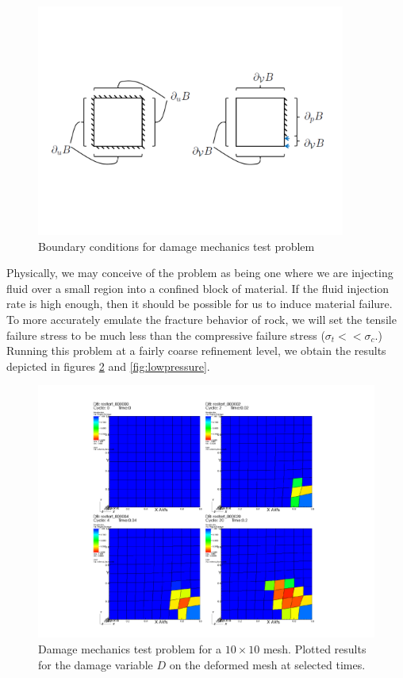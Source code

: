 \documentclass[11pt]{article} %
\begin{document}
\begin{figure} [!ht]
	\centering
	\includegraphics[width = 4.0in,trim=30 160 40 150,clip=true]{cracktest.pdf}
	\caption{Boundary conditions for damage mechanics test problem}
	\label{fig:cracktestbcs}
\end{figure}

Physically, we may conceive of the problem as being one where we are injecting fluid over a small region into a confined block of material. If the fluid injection rate is high enough, then it should be possible for us to induce material failure. To more accurately emulate the fracture behavior of rock, we will set the tensile failure stress to be much less than the compressive failure stress ($\sigma_t << \sigma_c$.) Running this problem at a fairly coarse refinement level, we obtain the results depicted in figures \ref{fig:lowdamage} and \ref{fig:lowpressure}.

\begin{figure} [!ht]
	\centering
	\includegraphics[width = 5.0in,trim=110 20 130 30,clip=true]{lowdamage.pdf}
	\caption{Damage mechanics test problem for a $10 \times 10$ mesh. Plotted results for the damage variable $D$ on the deformed mesh at selected times.}
	\label{fig:lowdamage}
\end{figure}
\end{document}
